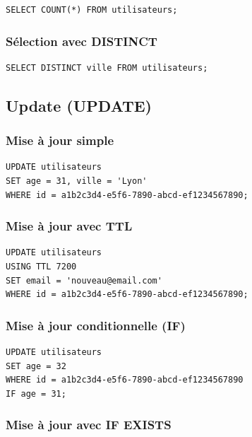 \documentclass[11pt,a4paper]{article}
\begin{document}
\begin{lstlisting}
SELECT COUNT(*) FROM utilisateurs;
\end{lstlisting}

\subsubsection{Sélection avec DISTINCT}

\begin{lstlisting}
SELECT DISTINCT ville FROM utilisateurs;
\end{lstlisting}

\subsection{Update (UPDATE)}

\subsubsection{Mise à jour simple}

\begin{lstlisting}
UPDATE utilisateurs
SET age = 31, ville = 'Lyon'
WHERE id = a1b2c3d4-e5f6-7890-abcd-ef1234567890;
\end{lstlisting}

\subsubsection{Mise à jour avec TTL}

\begin{lstlisting}
UPDATE utilisateurs
USING TTL 7200
SET email = 'nouveau@email.com'
WHERE id = a1b2c3d4-e5f6-7890-abcd-ef1234567890;
\end{lstlisting}

\subsubsection{Mise à jour conditionnelle (IF)}

\begin{lstlisting}
UPDATE utilisateurs
SET age = 32
WHERE id = a1b2c3d4-e5f6-7890-abcd-ef1234567890
IF age = 31;
\end{lstlisting}

\subsubsection{Mise à jour avec IF EXISTS}
\end{document}
